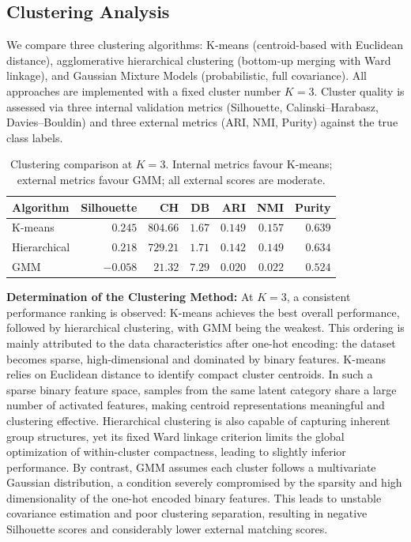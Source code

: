 \documentclass[11pt]{article}
\begin{document}
\subsection{Clustering Analysis}

We compare three clustering algorithms: K-means (centroid-based with 
Euclidean distance), agglomerative hierarchical clustering (bottom-up 
merging with Ward linkage), and Gaussian Mixture Models (probabilistic, full 
covariance). All approaches are implemented with a fixed cluster number 
$K=3$. Cluster quality is assessed via three internal validation metrics 
(Silhouette, Calinski--Harabasz, Davies--Bouldin) and three external 
metrics (ARI, NMI, Purity) against the true class labels.

\begin{table}[h]
  \centering
  \caption{Clustering comparison at $K{=}3$. Internal metrics favour
    K-means; external metrics favour GMM; all external scores are
    moderate.}
  \label{tab:cluster}
  \begin{tabular}{lrrrrrr}
    \toprule
    Algorithm    & Silhouette & CH      & DB    & ARI   & NMI   & Purity \\
    \midrule
    K-means      & $0.245$    & $804.66$& $1.67$& $0.149$ & $0.157$ & $0.639$ \\
    Hierarchical & $0.218$    & $729.21$& $1.71$& $0.142$ & $0.149$ & $0.634$ \\
    GMM          & $-0.058$    & $21.32$& $7.29$& $0.020$ & $0.022$ & $0.524$ \\
    \bottomrule
  \end{tabular}
\end{table}

\textbf{Determination of the Clustering Method:} At $K=3$, a consistent performance 
ranking is observed: K-means achieves the best overall performance, followed by 
hierarchical clustering, with GMM being the weakest. This ordering is mainly attributed 
to the data characteristics after one-hot encoding: the dataset becomes sparse, 
high-dimensional and dominated by binary features. K-means relies on Euclidean distance 
to identify compact cluster centroids. In such a sparse binary feature space, samples from the same latent category 
share a large number of activated features, making centroid representations meaningful 
and clustering effective. Hierarchical clustering is also capable of capturing inherent 
group structures, yet its fixed Ward linkage criterion limits the global optimization of 
within-cluster compactness, leading to slightly inferior performance. By contrast, GMM assumes each cluster 
follows a multivariate Gaussian distribution, a condition severely compromised by the sparsity and high 
dimensionality of the one-hot encoded binary features. This leads to unstable covariance estimation and poor 
clustering separation, resulting in negative Silhouette scores and considerably lower external matching scores.
\end{document}
